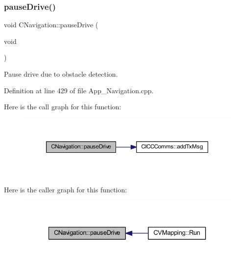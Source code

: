 \subsubsection{\texorpdfstring{pause\+Drive()}{pauseDrive()}}
{\footnotesize\ttfamily void C\+Navigation\+::pause\+Drive (\begin{DoxyParamCaption}\item[{void}]{ }\end{DoxyParamCaption})\hspace{0.3cm}{\ttfamily [virtual]}}



Pause drive due to obstacle detection. 



Definition at line 429 of file App\+\_\+\+Navigation.\+cpp.

Here is the call graph for this function\+:\nopagebreak
\begin{figure}[H]
\begin{center}
\leavevmode
\includegraphics[width=350pt]{class_c_navigation_a27649dc6324360829d42aea67e88e3ee_cgraph}
\end{center}
\end{figure}
Here is the caller graph for this function\+:\nopagebreak
\begin{figure}[H]
\begin{center}
\leavevmode
\includegraphics[width=327pt]{class_c_navigation_a27649dc6324360829d42aea67e88e3ee_icgraph}
\end{center}
\end{figure}
\mbox{\label{class_c_navigation_ac491c77788ba2e953a704b6ad622a665}} 
